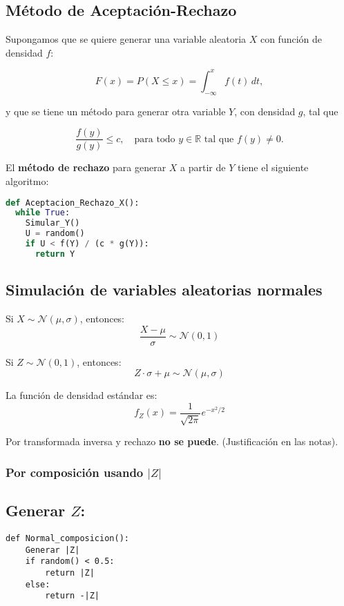 \documentclass[11pt, a4paper]{article}
\theoremstyle{definition}
\begin{document}
\subsection{Método de Aceptación-Rechazo}

Supongamos que se quiere generar una variable aleatoria \( X \) con función de densidad \( f \):

\[
F(x) = P(X \leq x) = \int_{-\infty}^{x} f(t) \, dt,
\]

y que se tiene un método para generar otra variable \( Y \), con densidad \( g \), tal que

\[
\frac{f(y)}{g(y)} \leq c, \quad \text{para todo } y \in \mathbb{R} \text{ tal que } f(y) \neq 0.
\]

El \textbf{método de rechazo} para generar \( X \) a partir de \( Y \) tiene el siguiente algoritmo:

\begin{lstlisting}[language=Python]
def Aceptacion_Rechazo_X():
  while True:
    Simular_Y()
    U = random()
    if U < f(Y) / (c * g(Y)):
      return Y
\end{lstlisting}



\subsection{Simulación de variables aleatorias normales}


Si \(X \sim \mathcal{N}(\mu, \sigma)\), entonces:
\[
\frac{X - \mu}{\sigma} \sim \mathcal{N}(0, 1)
\]

Si \(Z \sim \mathcal{N}(0, 1)\), entonces:
\[
Z \cdot \sigma + \mu \sim \mathcal{N}(\mu, \sigma)
\]

La función de densidad estándar es:
\[
f_Z(x) = \frac{1}{\sqrt{2\pi}} e^{-x^2/2}
\]

Por transformada inversa y rechazo \textbf{no se puede}. (Justificación en las notas).


\subsubsection{Por composición usando $|Z|$}


\subsection*{Generar \(Z\):}

\begin{lstlisting}
def Normal_composicion():
    Generar |Z|
    if random() < 0.5:
        return |Z|
    else:
        return -|Z|
\end{lstlisting}
\end{document}
